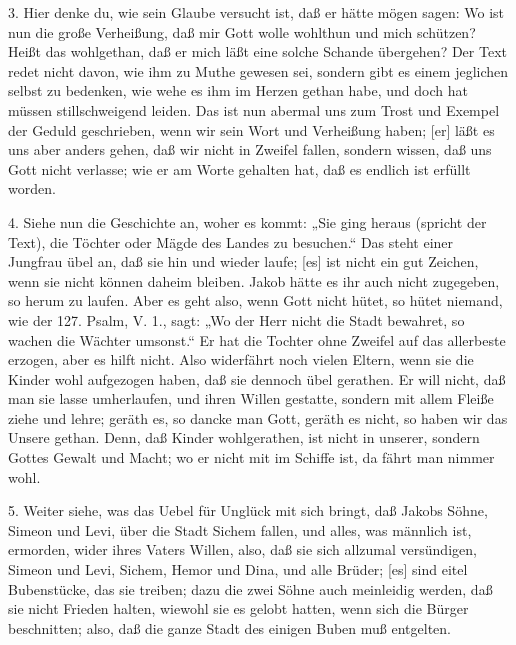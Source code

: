 3. Hier denke du, wie sein Glaube versucht ist, daß er hätte mögen sagen: Wo ist nun die große Verheißung, daß mir Gott wolle wohlthun und mich schützen? Heißt das wohlgethan, daß er mich läßt eine solche Schande übergehen? Der Text redet nicht davon, wie ihm zu Muthe gewesen sei, sondern gibt es einem jeglichen selbst zu bedenken, wie wehe es ihm im Herzen gethan habe, und doch hat müssen stillschweigend leiden. Das ist nun abermal uns zum Trost und Exempel der Geduld geschrieben, wenn wir sein Wort und Verheißung haben; [er] läßt es uns aber anders gehen, daß wir nicht in Zweifel fallen, sondern wissen, daß uns Gott nicht verlasse; wie er am Worte gehalten hat, daß es endlich ist erfüllt worden.

4. Siehe nun die Geschichte an, woher es kommt: „Sie ging heraus (spricht der Text), die Töchter oder Mägde des Landes zu besuchen.“ Das steht einer Jungfrau übel an, daß sie hin und wieder laufe; [es] ist nicht ein gut Zeichen, wenn sie nicht können daheim bleiben. Jakob hätte es ihr auch nicht zugegeben, so herum zu laufen. Aber es geht also, wenn Gott nicht hütet, so hütet niemand, wie der 127. Psalm, V. 1., sagt: „Wo der Herr nicht die Stadt bewahret, so wachen die Wächter umsonst.“ Er hat die Tochter ohne Zweifel auf das allerbeste erzogen, aber es hilft nicht. Also widerfährt noch vielen Eltern, wenn sie die Kinder wohl aufgezogen haben, daß sie dennoch übel gerathen. Er will nicht, daß man sie lasse umherlaufen, und ihren Willen gestatte, sondern mit allem Fleiße ziehe und lehre; geräth es, so dancke man
Gott, geräth es nicht, so haben wir das Unsere gethan. Denn, daß Kinder wohlgerathen, ist nicht in unserer, sondern Gottes Gewalt und Macht; wo er nicht mit im Schiffe ist, da fährt man nimmer wohl.

5. Weiter siehe, was das Uebel für Unglück mit sich bringt, daß Jakobs Söhne, Simeon und Levi, über die Stadt Sichem fallen, und alles, was männlich ist, ermorden, wider ihres Vaters Willen, also, daß sie sich allzumal versündigen, Simeon und Levi, Sichem, Hemor und Dina, und alle Brüder; [es] sind eitel Bubenstücke, das sie treiben; dazu die zwei Söhne auch meinleidig werden, daß sie nicht Frieden halten, wiewohl sie es gelobt hatten, wenn sich die Bürger beschnitten; also, daß die ganze Stadt des einigen Buben muß entgelten.

